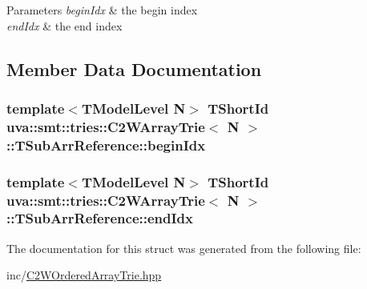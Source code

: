\begin{DoxyParams}{Parameters}
{\em begin\+Idx} & the begin index \\
\hline
{\em end\+Idx} & the end index \\
\hline
\end{DoxyParams}


\subsection{Member Data Documentation}
\hypertarget{structuva_1_1smt_1_1tries_1_1_c2_w_array_trie_1_1_t_sub_arr_reference_a7ac947b9ce9220d6115209629a1bda0e}{}
\subsubsection[{begin\+Idx}]{\setlength{\rightskip}{0pt plus 5cm}template$<$T\+Model\+Level N$>$ {\bf T\+Short\+Id} {\bf uva\+::smt\+::tries\+::\+C2\+W\+Array\+Trie}$<$ N $>$\+::T\+Sub\+Arr\+Reference\+::begin\+Idx}\label{structuva_1_1smt_1_1tries_1_1_c2_w_array_trie_1_1_t_sub_arr_reference_a7ac947b9ce9220d6115209629a1bda0e}
\hypertarget{structuva_1_1smt_1_1tries_1_1_c2_w_array_trie_1_1_t_sub_arr_reference_ae971b9041d86dee35237947786b8fef1}{}
\subsubsection[{end\+Idx}]{\setlength{\rightskip}{0pt plus 5cm}template$<$T\+Model\+Level N$>$ {\bf T\+Short\+Id} {\bf uva\+::smt\+::tries\+::\+C2\+W\+Array\+Trie}$<$ N $>$\+::T\+Sub\+Arr\+Reference\+::end\+Idx}\label{structuva_1_1smt_1_1tries_1_1_c2_w_array_trie_1_1_t_sub_arr_reference_ae971b9041d86dee35237947786b8fef1}


The documentation for this struct was generated from the following file\+:\begin{DoxyCompactItemize}
\item 
inc/\hyperlink{_c2_w_ordered_array_trie_8hpp}{C2\+W\+Ordered\+Array\+Trie.\+hpp}\end{DoxyCompactItemize}
